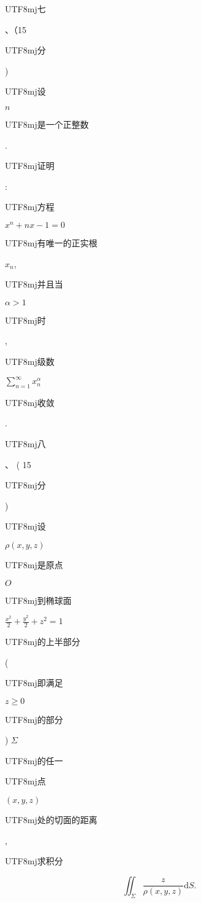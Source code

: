 \documentclass[10pt]{article}
\begin{document}
\begin{CJK}{UTF8}{mj}七\end{CJK}、（15 \begin{CJK}{UTF8}{mj}分\end{CJK}) \begin{CJK}{UTF8}{mj}设\end{CJK} $n$ \begin{CJK}{UTF8}{mj}是一个正整数\end{CJK}. \begin{CJK}{UTF8}{mj}证明\end{CJK}: \begin{CJK}{UTF8}{mj}方程\end{CJK} $x^{n}+n x-1=0$ \begin{CJK}{UTF8}{mj}有唯一的正实根\end{CJK} $x_{n}$, \begin{CJK}{UTF8}{mj}并且当\end{CJK} $\alpha>1$ \begin{CJK}{UTF8}{mj}时\end{CJK}, \begin{CJK}{UTF8}{mj}级数\end{CJK} $\sum_{n=1}^{\infty} x_{n}^{\alpha}$ \begin{CJK}{UTF8}{mj}收敛\end{CJK}.

\begin{CJK}{UTF8}{mj}八\end{CJK}、 ( 15 \begin{CJK}{UTF8}{mj}分\end{CJK}) \begin{CJK}{UTF8}{mj}设\end{CJK} $\rho(x, y, z)$ \begin{CJK}{UTF8}{mj}是原点\end{CJK} $O$ \begin{CJK}{UTF8}{mj}到椭球面\end{CJK} $\frac{x^{2}}{2}+\frac{y^{2}}{2}+z^{2}=1$ \begin{CJK}{UTF8}{mj}的上半部分\end{CJK} (\begin{CJK}{UTF8}{mj}即满足\end{CJK} $z \geq 0$ \begin{CJK}{UTF8}{mj}的部分\end{CJK}) $\Sigma$ \begin{CJK}{UTF8}{mj}的任一\end{CJK} \begin{CJK}{UTF8}{mj}点\end{CJK} $(x, y, z)$ \begin{CJK}{UTF8}{mj}处的切面的距离\end{CJK}, \begin{CJK}{UTF8}{mj}求积分\end{CJK}
$$
\iint_{\Sigma} \frac{z}{\rho(x, y, z)} \mathrm{d} S .
$$
\end{document}

